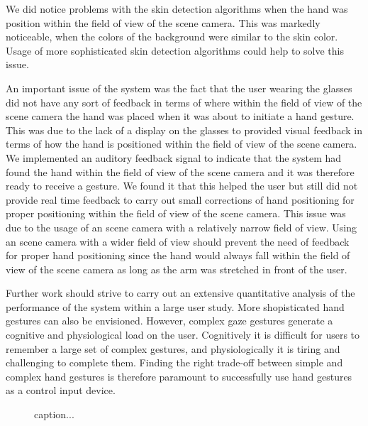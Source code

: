 \documentclass[jou,a4paper,notxfonts]{apa}
\begin{document}
We did notice problems with the skin detection algorithms when the hand was position within the field of view of the
scene camera. This was markedly noticeable, when the colors of the background were similar to the skin color. Usage of
more sophisticated skin detection algorithms could help to solve this issue.


An important issue of the system was the fact that the user wearing the glasses did not have any sort of feedback in
terms of where within the field of view of the scene camera the hand was placed when it was about to initiate a hand
gesture. This was due to the lack of a display on the glasses to provided visual feedback in terms of how the hand is
positioned within the field of view of the scene camera. We implemented an auditory feedback signal to indicate
that the system had found the hand within the field of view of the scene camera and it was therefore ready to receive a
gesture. We found it that this helped the user but still did not provide real time feedback to carry out small
corrections of hand positioning for proper positioning within the field of view of the scene camera. This issue was due
to the usage of an scene camera with a relatively narrow field of view. Using an scene camera with a wider field of view
should prevent the need of feedback for proper hand positioning since the hand would always fall within the field of
view of the scene camera as long as the arm was stretched in front of the user.


Further work should strive to carry out an extensive quantitative analysis of the performance of the system within a
large user study. More shopisticated hand gestures can also be envisioned. However, complex gaze gestures generate a
cognitive and physiological load on the user. Cognitively it is difficult for users to remember a large set of complex
gestures, and physiologically it is tiring and challenging to complete them. Finding the right trade-off between simple
and complex hand gestures is therefore paramount to successfully use hand gestures as a control input device.



\begin{figure}[tp]
 \caption{caption...}
 \label{fig:fig1}
\end{figure}
\end{document}
